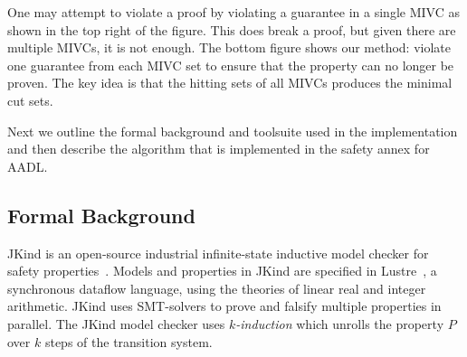 One may attempt to violate a proof by violating a guarantee in a single MIVC as shown in the top right of the figure. This does break a proof, but given there are multiple MIVCs, it is not enough. The bottom figure shows our method: violate one guarantee from each MIVC set to ensure that the property can no longer be proven. The key idea is that the hitting sets of all MIVCs produces the minimal cut sets. 

Next we outline the formal background and toolsuite used in the implementation and then describe the algorithm that is implemented in the safety annex for AADL. 

\subsection{Formal Background}
JKind is an open-source industrial infinite-state inductive model checker for safety properties~\cite{2017arXiv171201222G}. Models and properties in JKind are specified in Lustre~\cite{Halbwachs91:IEEE}, a synchronous dataflow language, using the theories of linear real and integer arithmetic. JKind uses SMT-solvers to prove and falsify multiple properties in parallel. The JKind model checker uses {\em
  $k$-induction} which unrolls the property $P$ over $k$ steps of the
transition system.




